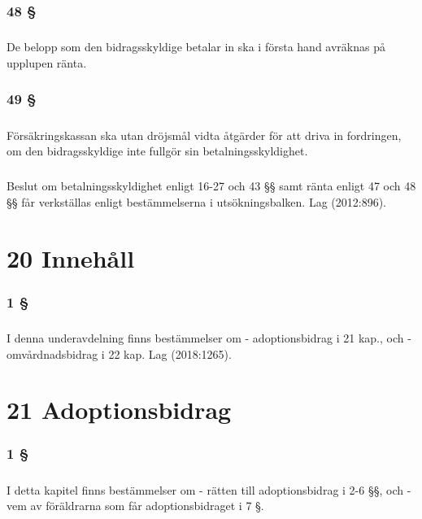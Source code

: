 \documentclass[a4paper,notitlepage,openany,10pt]{book}
\begin{document}
\subsection*{48 §}
\paragraph*{}
De belopp som den bidragsskyldige betalar in ska i första hand avräknas på upplupen ränta.
\subsection*{49 §}
\paragraph*{}
Försäkringskassan ska utan dröjsmål vidta åtgärder för att driva in fordringen, om den bidragsskyldige inte fullgör sin betalningsskyldighet.
\paragraph*{}
Beslut om betalningsskyldighet enligt 16-27 och 43 §§ samt ränta enligt 47 och 48 §§ får verkställas enligt bestämmelserna i utsökningsbalken.
Lag (2012:896).
\chapter*{20 Innehåll}
\subsection*{1 §}
\paragraph*{}
I denna underavdelning finns bestämmelser om
\newline - adoptionsbidrag i 21 kap., och
\newline - omvårdnadsbidrag i 22 kap.
Lag (2018:1265).
\chapter*{21 Adoptionsbidrag}
\subsection*{1 §}
\paragraph*{}
I detta kapitel finns bestämmelser om
\newline - rätten till adoptionsbidrag i 2-6 §§, och
\newline - vem av föräldrarna som får adoptionsbidraget i 7 §.
\end{document}
